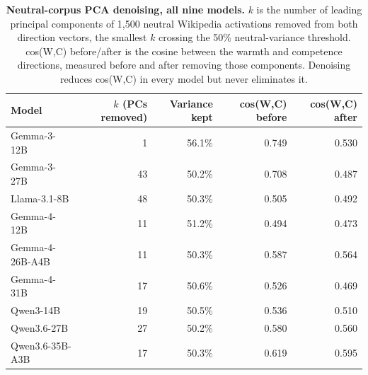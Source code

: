 \begin{table}[H]
\centering
\small
\begin{tabular}{@{}lrrrr@{}}
\toprule
Model & $k$ (PCs removed) & Variance kept & cos(W,C) before & cos(W,C) after \\
\midrule
Gemma-3-12B & 1 & 56.1\% & 0.749 & 0.530 \\
Gemma-3-27B & 43 & 50.2\% & 0.708 & 0.487 \\
Llama-3.1-8B & 48 & 50.3\% & 0.505 & 0.492 \\
Gemma-4-12B & 11 & 51.2\% & 0.494 & 0.473 \\
Gemma-4-26B-A4B & 11 & 50.3\% & 0.587 & 0.564 \\
Gemma-4-31B & 17 & 50.6\% & 0.526 & 0.469 \\
Qwen3-14B & 19 & 50.5\% & 0.536 & 0.510 \\
Qwen3.6-27B & 27 & 50.2\% & 0.580 & 0.560 \\
Qwen3.6-35B-A3B & 17 & 50.3\% & 0.619 & 0.595 \\
\bottomrule
\end{tabular}
\caption{\textbf{Neutral-corpus PCA denoising, all nine models.} $k$ is the number of leading principal components of 1,500 neutral Wikipedia activations removed from both direction vectors, the smallest $k$ crossing the 50\% neutral-variance threshold. cos(W,C) before/after is the cosine between the warmth and competence directions, measured before and after removing those components. Denoising reduces cos(W,C) in every model but never eliminates it.}
\label{tab:pca_denoising}
\end{table}
